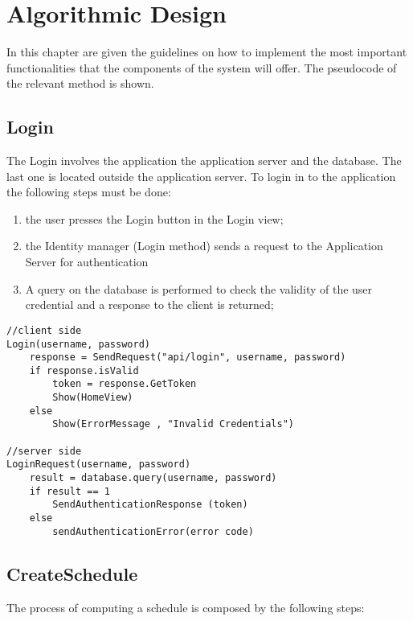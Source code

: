 \chapter{Algorithmic Design}
In this chapter are given the guidelines on how to implement the most important functionalities that the components of the system will offer. The pseudocode of the relevant method is shown. 

\section{Login}
The Login involves the application the application server and the database. The last one is located outside the application server. 
To login in to the application the following steps must be done:
\begin{enumerate}
\item the user presses the Login button in the Login view;
\item the Identity manager (Login method) sends a request to the Application Server for authentication
\item A query on the database is performed to check the validity of the user credential and a response to the client is returned;
\end{enumerate}

\begin{lstlisting}
//client side
Login(username, password)
	response = SendRequest("api/login", username, password)
	if response.isValid 
		token = response.GetToken
		Show(HomeView)
	else
		Show(ErrorMessage , "Invalid Credentials")

//server side
LoginRequest(username, password)
	result = database.query(username, password)
	if result == 1
		SendAuthenticationResponse (token)
	else
		sendAuthenticationError(error code)
\end{lstlisting}

\section{CreateSchedule}
The process of computing a schedule is composed by the following steps:

